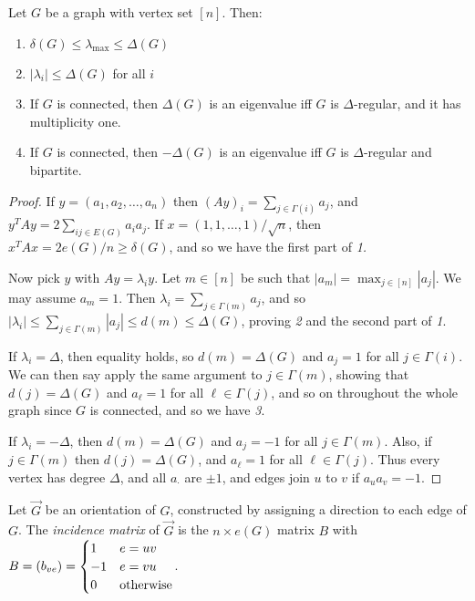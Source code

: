 \documentclass[10pt,a4paper]{article}
\begin{document}
\begin{theorem}
Let $G$ be a graph with vertex set $[n]$. Then:
\begin{enumerate}
\item $\delta(G) \leq \lambda_{\max} \leq \Delta(G)$
\item $|\lambda_i| \leq \Delta(G)$ for all $i$
\item If $G$ is connected, then $\Delta(G)$ is an eigenvalue iff $G$ is $\Delta$-regular, and it has multiplicity one.
\item If $G$ is connected, then $-\Delta(G)$ is an eigenvalue iff $G$ is $\Delta$-regular and bipartite.
\end{enumerate}
\end{theorem}
\begin{proof}
If $y = (a_1, a_2, \ldots, a_n)$ then $(Ay)_i = \sum_{j \in \Gamma(i)} a_j$, and $y^T A y = 2 \sum_{ij \in E(G)} a_i a_j$. If $x = (1,1,\ldots,1)/\sqrt{n}$, then $x^T Ax = 2e(G)/n \geq \delta(G)$, and so we have the first part of \textit{1.}

Now pick $y$ with $Ay = \lambda_i y$. Let $m \in [n]$ be such that $|a_m| = \max_{j \in [n]} |a_j|$. We may assume $a_m = 1$. Then $\lambda_i = \sum_{j \in \Gamma(m)} a_j$, and so $|\lambda_i| \leq \sum_{j \in \Gamma(m)} |a_j| \leq d(m) \leq \Delta(G)$, proving \textit{2} and the second part of \textit{1}.

If $\lambda_i = \Delta$, then equality holds, so $d(m) = \Delta(G)$ and $a_j = 1$ for all $j \in \Gamma(i)$. We can then say apply the same argument to $j \in \Gamma(m)$, showing that $d(j) = \Delta(G)$ and $a_\ell =1$ for all $\ell \in \Gamma(j)$, and so on throughout the whole graph since $G$ is connected, and so we have \textit{3}.

If $\lambda_i = -\Delta$, then $d(m) = \Delta(G)$ and $a_j = -1$ for all $j \in \Gamma(m)$. Also, if $j \in \Gamma(m)$ then $d(j) = \Delta(G)$, and $a_\ell = 1$ for all $\ell \in \Gamma(j)$. Thus every vertex has degree $\Delta$, and all $a_{\cdot}$ are $\pm 1$, and edges join $u$ to $v$ if $a_u a_v = -1$.
\end{proof}

Let $\vec{G}$ be an orientation of $G$, constructed by assigning a direction to each edge of $G$. The \emph{incidence matrix} of $\vec{G}$ is the $n \times e(G)$ matrix $B$ with $B = (b_{ve}) = \begin{cases} 1 & e = uv \\ -1 & e = vu \\ 0 & \text{otherwise}\end{cases}$.
\end{document}
